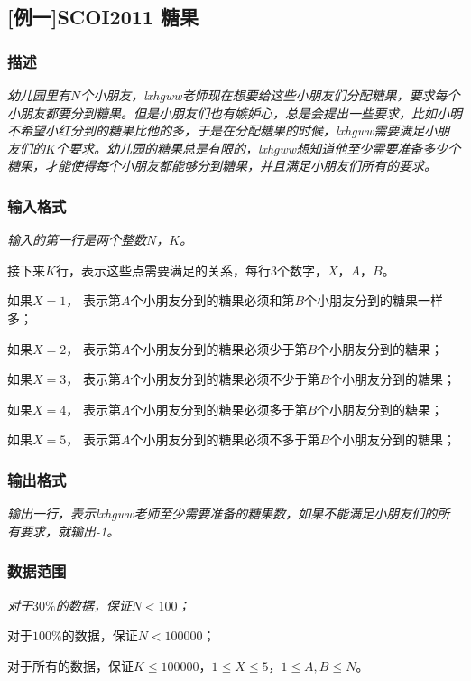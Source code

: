 \subsection{[例一]SCOI2011 糖果}
\subsubsection{描述}
{\itshape 幼儿园里有$N$个小朋友，lxhgww老师现在想要给这些小朋友们分配糖果，要求每个小朋友都要分到糖果。但是小朋友们也有嫉妒心，总是会提出一些要求，比如小明不希望小红分到的糖果比他的多，于是在分配糖果的时候，lxhgww需要满足小朋友们的$K$个要求。幼儿园的糖果总是有限的，lxhgww想知道他至少需要准备多少个糖果，才能使得每个小朋友都能够分到糖果，并且满足小朋友们所有的要求。}
\subsubsection{输入格式}
{\itshape 输入的第一行是两个整数$N$，$K$。\par
接下来$K$行，表示这些点需要满足的关系，每行3个数字，$X$，$A$，$B$。\par
如果$X=1$， 表示第$A$个小朋友分到的糖果必须和第$B$个小朋友分到的糖果一样多；\par
如果$X=2$， 表示第$A$个小朋友分到的糖果必须少于第$B$个小朋友分到的糖果；\par
如果$X=3$， 表示第$A$个小朋友分到的糖果必须不少于第$B$个小朋友分到的糖果；\par
如果$X=4$， 表示第$A$个小朋友分到的糖果必须多于第$B$个小朋友分到的糖果；\par
如果$X=5$， 表示第$A$个小朋友分到的糖果必须不多于第$B$个小朋友分到的糖果；}
\subsubsection{输出格式}
{\itshape 输出一行，表示lxhgww老师至少需要准备的糖果数，如果不能满足小朋友们的所有要求，就输出-1。}
\subsubsection{数据范围}
{\itshape
对于$30\%$的数据，保证$N < 100$； \par
对于$100\%$的数据，保证$N < 100000$；\par
对于所有的数据，保证$K \leq 100000$，$ 1 \leq X \leq 5$，$1 \leq A,B \leq N$。
}
